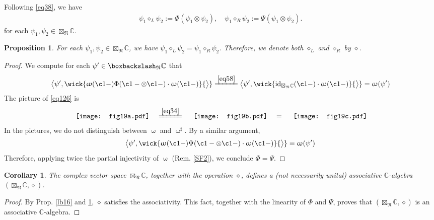 \documentclass[11pt,b5paper,notitlepage]{article}
\theoremstyle{definition}
\theoremstyle{plain}
\newtheorem{pp}[df]{Proposition}
\newtheorem{co}[df]{Corollary}
\newcommand{\Cbb}{\mathbb C}
\newcommand{\<}{\left\langle}
\renewcommand{\>}{\right\rangle}
\newcommand{\bbs}{\boxbackslash}
\newcommand{\id}{\mathrm{id}}
\newcommand{\fn}{\mathfrak{N}}
\newcommand{\Lan}{{\big\langle}}
\newcommand{\Ran}{{\big\rangle}}
\numberwithin{equation}{section}
\begin{document}
Following \eqref{eq38}, we have 
\begin{align}\label{eq40}
	\psi_1\diamond_L \psi_2:=\Phi(\psi_1\otimes \psi_2), \quad \psi_1\diamond_R \psi_2:=\Psi(\psi_1\otimes \psi_2).
 \end{align}
 for each $\psi_1,\psi_2\in \boxtimes_\fn\Cbb$.
\begin{pp}\label{lb15}
	For each $\psi_1,\psi_2\in \boxtimes_\fn\Cbb$, we have $\psi_1\diamond_L \psi_2=\psi_1\diamond_R \psi_2$. Therefore, we denote both $\diamond_L$ and $\diamond_R$ by $\diamond$.
\end{pp}


\begin{proof}
We compute for each $\psi'\in\bbs_\fn\Cbb$ that
	\begin{align}\label{eq126}
\Lan\psi',\wick{\upomega(\c1-)\Phi(\c1 -\otimes \c1-)\cdot \upomega(\c1 -)}\Ran\xlongequal{\eqref{eq58}}\Lan\psi',\wick{\id_{\boxtimes_\fn\Cbb}(\c1-)\cdot \upomega(\c1 -)}\Ran=\upomega(\psi')
	\end{align}
The picture of \eqref{eq126} is
\begin{align}\label{eq127}
		\vcenter{\hbox{{
			\texttt{[image: fig19a.pdf]}}}}\quad\xlongequal{\eqref{eq34}}\quad \vcenter{\hbox{{
			   \texttt{[image: fig19b.pdf]}}}}\quad=\quad\vcenter{\hbox{{
				\texttt{[image: fig19c.pdf]}}}}
	\end{align}
In the pictures, we do not distinguish between $\upomega$ and $\upomega^\sharp$. By a similar argument, 
\begin{align*}
\Lan\psi',\wick{\upomega(\c1-)\Psi(\c1 -\otimes \c1-)\cdot \upomega(\c1 -)}\Ran=\upomega(\psi')
\end{align*}
Therefore, applying twice the partial injectivity of $\upomega$ (Rem. \ref{SF2}), we conclude $\Phi=\Psi$.
\end{proof}


\begin{co}\label{lb82}
The complex vector space $\boxtimes_\fn\Cbb$, together with the operation $\diamond$, defines a (not necessarily unital) associative $\Cbb$-algebra $(\boxtimes_\fn\Cbb,\diamond)$.
\end{co}
\begin{proof}
By Prop. \ref{lb16} and \ref{lb15}, $\diamond$ satisfies the associativity. This fact, together with the linearity of $\Phi$ and $\Psi$, proves that $(\boxtimes_\fn\Cbb,\diamond)$ is an associative $\Cbb$-algebra.
\end{proof}
\end{document}
